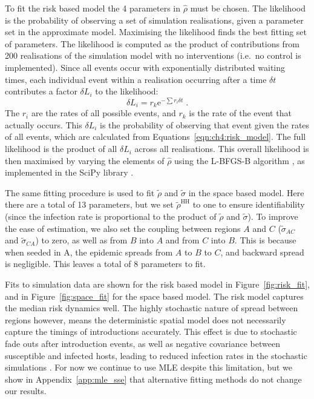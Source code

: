 To fit the risk based model the 4 parameters in $\hat{\rho}$ must be chosen. The likelihood is the probability of observing a set of simulation realisations, given a parameter set in the approximate model. Maximising the likelihood finds the best fitting set of parameters. The likelihood is computed as the product of contributions from 200 realisations of the simulation model with no interventions (i.e.\ no control is implemented). Since all events occur with exponentially distributed waiting times, each individual event within a realisation occurring after a time $\delta{}t$ contributes a factor $\delta{}L_i$ to the likelihood:
\begin{equation}
\delta{}L_i = r_k\mathrm{e}^{-\sum{}r_i\delta{}t}\;.
\end{equation}
The $r_i$ are the rates of all possible events, and $r_k$ is the rate of the event that actually occurs. This $\delta{}L_i$ is the probability of observing that event given the rates of all events, which are calculated from Equations~\ref{eqn:ch4:risk_model}. The full likelihood is the product of all $\delta{}L_i$ across all realisations. This overall likelihood is then maximised by varying the elements of $\hat{\rho}$ using the L-BFGS-B algorithm \citep{byrd_limited_1995}, as implemented in the SciPy library \citep{scipy}.

The same fitting procedure is used to fit $\tilde{\rho}$ and $\tilde{\sigma}$ in the space based model. Here there are a total of 13 parameters, but we set $\tilde{\rho}^\mathrm{HH}$ to one to ensure identifiability (since the infection rate is proportional to the product of $\tilde{\rho}$ and $\tilde{\sigma}$). To improve the ease of estimation, we also set the coupling between regions $A$ and $C$ ($\tilde{\sigma}_{AC}$ and $\tilde{\sigma}_{CA}$) to zero, as well as from $B$ into $A$ and from $C$ into $B$. This is because when seeded in A, the epidemic spreads from $A$ to $B$ to $C$, and backward spread is negligible. This leaves a total of 8 parameters to fit.

Fits to simulation data are shown for the risk based model in Figure~\ref{fig:risk_fit}, and in Figure~\ref{fig:space_fit} for the space based model. The risk model captures the median risk dynamics well. The highly stochastic nature of spread between regions however, means the deterministic spatial model does not necessarily capture the timings of introductions accurately. This effect is due to stochastic fade outs after introduction events, as well as negative covariance between susceptible and infected hosts, leading to reduced infection rates in the stochastic simulations \citep[pp.~227--229 and pp.~238--240]{keeling_modeling_2008}. For now we continue to use MLE despite this limitation, but we show in Appendix~\ref{app:mle_sse} that alternative fitting methods do not change our results.

